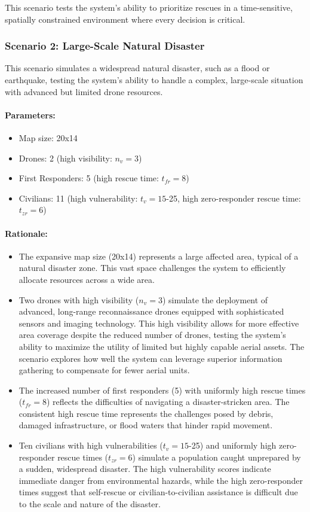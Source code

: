 This scenario tests the system's ability to prioritize rescues in a time-sensitive, spatially constrained environment where every decision is critical.

\subsubsection{Scenario 2: Large-Scale Natural Disaster}

This scenario simulates a widespread natural disaster, such as a flood or earthquake, testing the system's ability to handle a complex, large-scale situation with advanced but limited drone resources.

\paragraph{Parameters:}
\begin{itemize}
	\item Map size: 20x14
	\item Drones: 2 (high visibility: $n_v = 3$)
	\item First Responders: 5 (high rescue time: $t_{fr} = 8$)
	\item Civilians: 11 (high vulnerability: $t_v = 15$-25, high zero-responder rescue time: $t_{zr} = 6$)
\end{itemize}

\paragraph{Rationale:}
\begin{itemize}
	\item The expansive map size (20x14) represents a large affected area, typical of a natural disaster zone. This vast space challenges the system to efficiently allocate resources across a wide area.
	\item Two drones with high visibility ($n_v = 3$) simulate the deployment of advanced, long-range reconnaissance drones equipped with sophisticated sensors and imaging technology. This high visibility allows for more effective area coverage despite the reduced number of drones, testing the system's ability to maximize the utility of limited but highly capable aerial assets. The scenario explores how well the system can leverage superior information gathering to compensate for fewer aerial units.
	\item The increased number of first responders (5) with uniformly high rescue times ($t_{fr} = 8$) reflects the difficulties of navigating a disaster-stricken area. The consistent high rescue time represents the challenges posed by debris, damaged infrastructure, or flood waters that hinder rapid movement.
	\item Ten civilians with high vulnerabilities ($t_v = 15$-25) and uniformly high zero-responder rescue times ($t_{zr} = 6$) simulate a population caught unprepared by a sudden, widespread disaster. The high vulnerability scores indicate immediate danger from environmental hazards, while the high zero-responder times suggest that self-rescue or civilian-to-civilian assistance is difficult due to the scale and nature of the disaster.
\end{itemize}

